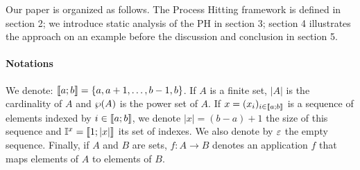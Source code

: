 Our paper is organized as follows.
The Process Hitting framework is defined in section 2;
we introduce static analysis of the PH in section 3;
section 4 illustrates the approach on an example
before the discussion and conclusion in section 5.

\paragraph*{Notations}
We denote: $\llbracket a; b \rrbracket = \{ a, a+1, \dots, b-1, b \}$.
If $A$ is a finite set,
$|A|$ is the cardinality of $A$
and $\wp(A)$ is the power set of $A$.
If $x = (x_i)_{i \in \llbracket a; b \rrbracket}$ is a sequence of elements indexed by $i \in \llbracket a; b \rrbracket$,
we denote $|x| = (b-a)+1$ the size of this sequence
and $\mathbb{I}^{x} = \llbracket 1; |x| \rrbracket$ its set of indexes.
We also denote by $\varepsilon$ the empty sequence.
Finally, if $A$ and $B$ are sets,
$f : A \rightarrow B$ denotes an application $f$ that maps elements of $A$ to elements of $B$.
